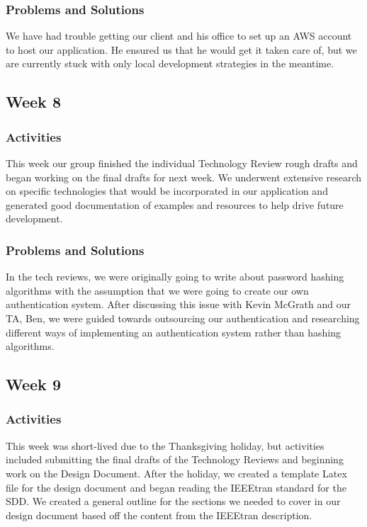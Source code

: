 \documentclass[journal,10pt,onecolumn,compsoc]{IEEEtran} \usepackage[margin=1.0in]{geometry} \usepackage{pdfpages}
\begin{document}
    \subsubsection{Problems and Solutions} 
    We have had trouble getting our client and his office to set up an AWS account to host our application. He ensured us that he would get it taken care of, but we are currently stuck with only local development strategies in the meantime.
    \subsection{Week 8}
    \subsubsection{Activities}  
    This week our group finished the individual Technology Review rough drafts and began working on the final drafts for next week. We underwent extensive research on specific technologies that would be incorporated in our application and generated good documentation of examples and resources to help drive future development.
    \subsubsection{Problems and Solutions} 
    In the tech reviews, we were originally going to write about password hashing algorithms with the assumption that we were going to create our own authentication system. After discussing this issue with Kevin McGrath and our TA, Ben, we were guided towards outsourcing our authentication and researching different ways of implementing an authentication system rather than hashing algorithms.
    \subsection{Week 9}
    \subsubsection{Activities} 
    This week was short-lived due to the Thanksgiving holiday, but activities included submitting the final drafts of the Technology Reviews and beginning work on the Design Document. After the holiday, we created a template Latex file for the design document and began reading the IEEEtran standard for the SDD. We created a general outline for the sections we needed to cover in our design document based off the content from the IEEEtran description.
\end{document}
